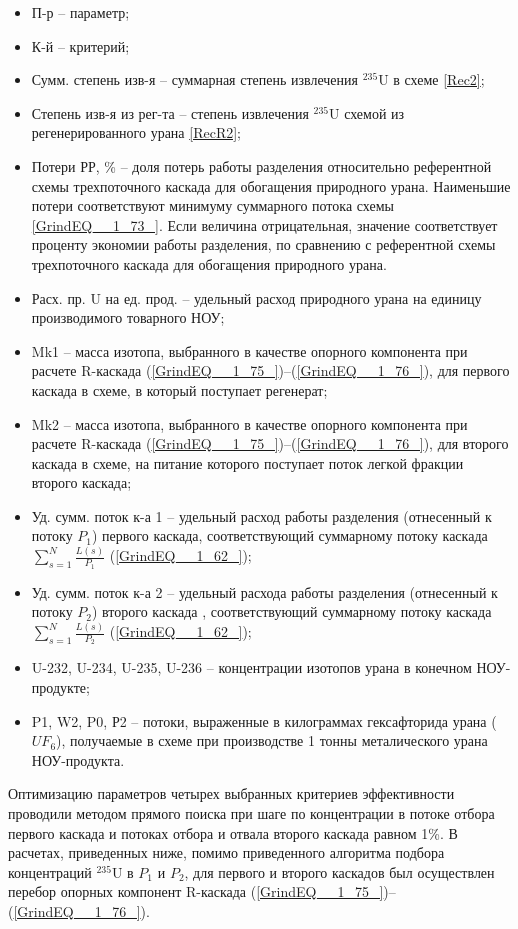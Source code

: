 \begin{itemize}
  \item П-р -- параметр;
  \item К-й -- критерий;
  \item Сумм. степень изв-я -- суммарная степень извлечения $^{235}$U в схеме \ref{Rec2};
  \item Степень изв-я из рег-та -- степень извлечения $^{235}$U схемой из регенерированного урана \ref{RecR2};
  \item Потери РР, \% -- доля потерь работы разделения относительно референтной схемы трехпоточного каскада для обогащения природного урана. Наименьшие потери соответствуют минимуму суммарного потока схемы \ref{GrindEQ__1_73_}. Если величина отрицательная, значение соответствует проценту экономии работы разделения, по сравнению с референтной схемы трехпоточного каскада для обогащения природного урана.
  \item Расх. пр. U на ед. прод. -- удельный расход природного урана на единицу производимого товарного НОУ;
  \item Mk1 -- масса изотопа, выбранного в качестве опорного компонента при расчете R-каскада (\ref{GrindEQ__1_75_})--(\ref{GrindEQ__1_76_}), для первого каскада в схеме, в который поступает регенерат;
  \item Mk2 -- масса изотопа, выбранного в качестве опорного компонента при расчете R-каскада (\ref{GrindEQ__1_75_})--(\ref{GrindEQ__1_76_}), для второго каскада в схеме, на питание которого поступает поток легкой фракции второго каскада;
  \item Уд. сумм. поток к-а 1 -- удельный расход работы разделения (отнесенный к потоку $P_{1}$) первого каскада, соответствующий суммарному потоку каскада $\sum _{s=1}^{N}\frac{L(s)}{P_{1}}$ (\ref{GrindEQ__1_62_});
  \item Уд. сумм. поток к-а 2 -- удельный расхода работы разделения (отнесенный к потоку $P_{2}$) второго каскада , соответствующий суммарному потоку каскада $\sum _{s=1}^{N}\frac{L(s)}{P_{2}}$ (\ref{GrindEQ__1_62_});
  \item U-232, U-234, U-235, U-236 -- концентрации изотопов урана в конечном НОУ-продукте;
  \item P1, W2, P0, Р2 -- потоки, выраженные в килограммах гексафторида урана ($UF_6$), получаемые в схеме при производстве 1 тонны металического урана НОУ-продукта.
\end{itemize}

Оптимизацию параметров четырех выбранных критериев эффективности проводили методом прямого поиска при шаге по концентрации в потоке отбора первого каскада и потоках отбора и отвала второго каскада равном 1\%. В расчетах, приведенных ниже, помимо приведенного алгоритма подбора концентраций $^{235}$U в  $P_1$ и $P_2$, для первого и второго каскадов был осуществлен перебор опорных компонент R-каскада (\ref{GrindEQ__1_75_})--(\ref{GrindEQ__1_76_}).

